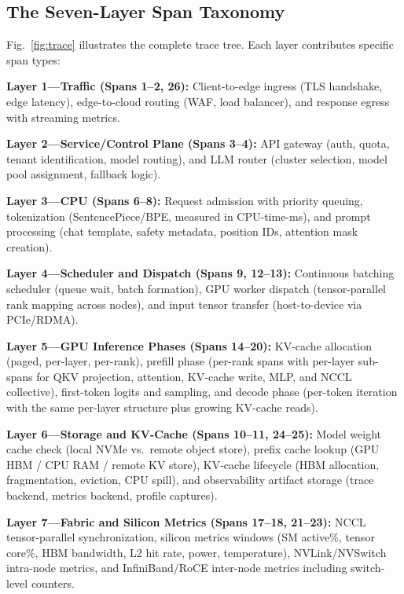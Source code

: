 \documentclass[conference,10pt]{IEEEtran}
\begin{document}
\subsection{The Seven-Layer Span Taxonomy}

Fig.~\ref{fig:trace} illustrates the complete trace tree. Each layer contributes specific span types:

\textbf{Layer 1---Traffic (Spans 1--2, 26):} Client-to-edge ingress (TLS handshake, edge latency), edge-to-cloud routing (WAF, load balancer), and response egress with streaming metrics.

\textbf{Layer 2---Service/Control Plane (Spans 3--4):} API gateway (auth, quota, tenant identification, model routing), and LLM router (cluster selection, model pool assignment, fallback logic).

\textbf{Layer 3---CPU (Spans 6--8):} Request admission with priority queuing, tokenization (SentencePiece/BPE, measured in CPU-time-ms), and prompt processing (chat template, safety metadata, position IDs, attention mask creation).

\textbf{Layer 4---Scheduler and Dispatch (Spans 9, 12--13):} Continuous batching scheduler (queue wait, batch formation), GPU worker dispatch (tensor-parallel rank mapping across nodes), and input tensor transfer (host-to-device via PCIe/RDMA).

\textbf{Layer 5---GPU Inference Phases (Spans 14--20):} KV-cache allocation (paged, per-layer, per-rank), prefill phase (per-rank spans with per-layer sub-spans for QKV projection, attention, KV-cache write, MLP, and NCCL collective), first-token logits and sampling, and decode phase (per-token iteration with the same per-layer structure plus growing KV-cache reads).

\textbf{Layer 6---Storage and KV-Cache (Spans 10--11, 24--25):} Model weight cache check (local NVMe vs.\ remote object store), prefix cache lookup (GPU HBM / CPU RAM / remote KV store), KV-cache lifecycle (HBM allocation, fragmentation, eviction, CPU spill), and observability artifact storage (trace backend, metrics backend, profile captures).

\textbf{Layer 7---Fabric and Silicon Metrics (Spans 17--18, 21--23):} NCCL tensor-parallel synchronization, silicon metrics windows (SM active\%, tensor core\%, HBM bandwidth, L2 hit rate, power, temperature), NVLink/NVSwitch intra-node metrics, and InfiniBand/RoCE inter-node metrics including switch-level counters.
\end{document}
